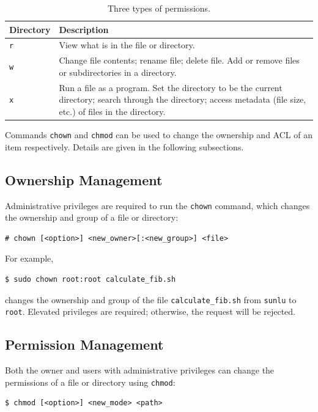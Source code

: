 \begin{table}[!htb]
  \centering \caption{Three types of permissions.}\label{ch:fm:tab:threepermissions}
  \begin{tabularx}{\textwidth}{lX}
    \hline
    Directory & Description \\ \hline
    \verb|r| & View what is in the file or directory. \\ 
    \verb|w| & Change file contents; rename file; delete file. Add or remove files or subdirectories in a directory. \\ 
    \verb|x| & Run a file as a program. Set the directory to be the current directory; search through the directory; access metadata (file size, etc.) of files in the directory. \\
    \hline
  \end{tabularx}
\end{table}

Commands \verb|chown| and \verb|chmod| can be used to change the ownership and ACL of an item respectively. Details are given in the following subsections.

\subsection{Ownership Management} \label{sec:chown}

Administrative privileges are required to run the \verb|chown| command, which changes the ownership and group of a file or directory:
\begin{lstlisting}
# chown [<option>] <new_owner>[:<new_group>] <file>
\end{lstlisting}

For example,
\begin{lstlisting}
$ sudo chown root:root calculate_fib.sh
\end{lstlisting}
changes the ownership and group of the file \verb|calculate_fib.sh| from \verb|sunlu| to \verb|root|. Elevated privileges are required; otherwise, the request will be rejected.

\subsection{Permission Management} \label{sec:chmod}

Both the owner and users with administrative privileges can change the permissions of a file or directory using \verb|chmod|:
\begin{lstlisting}
$ chmod [<option>] <new_mode> <path>
\end{lstlisting}

